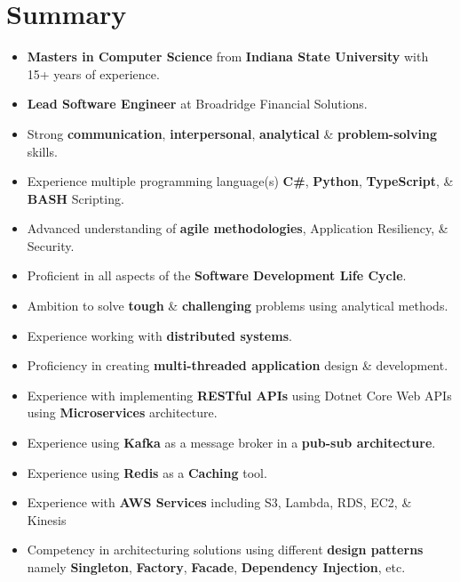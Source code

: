 \documentclass[letterpaper,9pt]{article}
\begin{document}
\section{Summary}
\begin{itemize}[itemsep=0.5em]
	\item \textbf{Masters in Computer Science} from \textbf{Indiana State University} with 15+ years of experience.
    \item \textbf{\color{black}Lead Software Engineer} at Broadridge Financial Solutions.
    \item Strong \textbf{\color{black}communication}, \textbf{\color{black}interpersonal}, \textbf{\color{black}analytical} \& \textbf{\color{black}problem-solving} skills.
    \item Experience multiple programming language(s) \textbf{\color{black}C\#}, \textbf{\color{black}Python}, \textbf{\color{black}TypeScript}, \& \textbf{\color{black}BASH} Scripting.
    \item Advanced understanding of \textbf{\color{black}agile methodologies}, Application Resiliency, \& Security.
    \item Proficient in all aspects of the \textbf{\color{black}Software Development Life Cycle}.
    \item Ambition to solve \textbf{\color{black}tough} \& \textbf{\color{black}challenging} problems using analytical methods.
    \item Experience working with \textbf{\color{black}distributed systems}.
    \item Proficiency in creating \textbf{\color{black}multi-threaded application} design \& development.
    \item Experience with implementing \textbf{\color{black}RESTful APIs} using Dotnet Core Web APIs using \textbf{\color{black}Microservices} architecture.
    \item Experience using \textbf{\color{black}Kafka} as a message broker in a \textbf{\color{black}pub-sub architecture}.
    \item Experience using \textbf{\color{black}Redis} as a \textbf{\color{black}Caching} tool.
    \item Experience with \textbf{\color{black}AWS Services} including S3, Lambda, RDS, EC2, \& Kinesis
    \item Competency in architecturing solutions using different \textbf{\color{black}design patterns} namely \textbf{\color{black}Singleton}, \textbf{\color{black}Factory}, \textbf{\color{black}Facade}, \textbf{\color{black}Dependency Injection}, etc.

\end{itemize}
\end{document}

